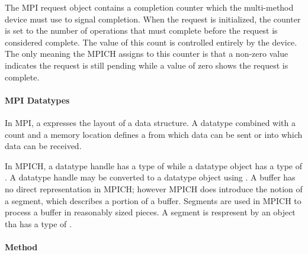 \begin{comment}
  Is this mapping of objects to types true for requests?  They appear to be
  treated differently that other MPI types in the design document.
\end{comment}

The MPI request object contains a completion counter which the multi-method
device must use to signal completion.  When the request is initialized, the
counter is set to the number of operations that must complete before the
request is considered complete.  The value of this count is controlled entirely
by the device.  The only meaning the MPICH assigns to this counter is that a
non-zero value indicates the request is still pending while a value of zero
shows the request is complete.


\paragraph{MPI Datatypes}

In MPI, a  expresses the layout of a data structure.  A datatype
combined with a count and a memory location defines a  from which
data can be sent or into which data can be received.

In MPICH, a datatype handle has a type of  while a datatype
object has a type of .  A datatype handle may be converted
to a datatype object using .  A buffer has no
direct representation in MPICH; however MPICH does introduce the notion of a
segment, which describes a portion of a buffer.  Segments are used in MPICH to
process a buffer in reasonably sized pieces.  A segment is respresent by an
object tha has a type of .


\paragraph{Method}



